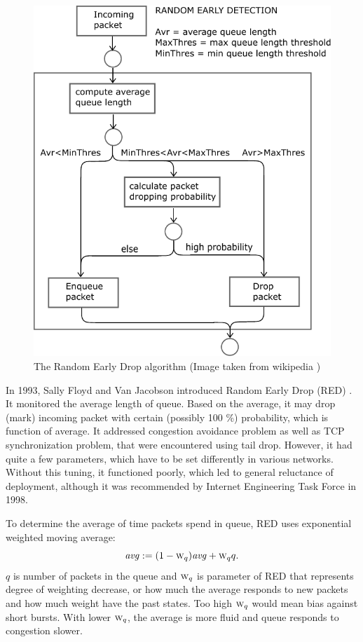 \begin{figure}
	\centering
	\includegraphics[width=.8\linewidth]{drawings/RED}
	\caption{The Random Early Drop algorithm (Image taken from wikipedia \cite{RED:picture}) }
	
	\label{fig04:RED}
\end{figure}

In 1993, Sally Floyd and Van Jacobson introduced Random Early Drop (RED) \cite{Floyd:1993:RED:169931.169935}. It monitored the average length of queue. Based on the average, it may drop (mark) incoming packet with certain (possibly 100 \%) probability, which is function of average. It addressed congestion avoidance problem as well as TCP synchronization problem, that were encountered using tail drop. However, it had quite a few parameters, which have to be set differently in various networks. Without this tuning, it functioned poorly, which led to general reluctance of deployment, although it was recommended by Internet Engineering Task Force \cite{rfc2309} in 1998.

To determine the average of time packets spend in queue, RED uses exponential weighted moving average:
\[
\text{\emph{avg}} := (1 - \textsc{w}_q)\text{\emph{avg}}+\textsc{w}_qq.
\]
$q$ is number of packets in the queue and $\textsc{w}_q$ is parameter of RED that represents degree of weighting decrease, or how much the average responds to new packets and how much weight have the past states. Too high $\textsc{w}_q$ would mean bias against short bursts. With lower $\textsc{w}_q$, the average is more fluid and queue responds to congestion slower.

